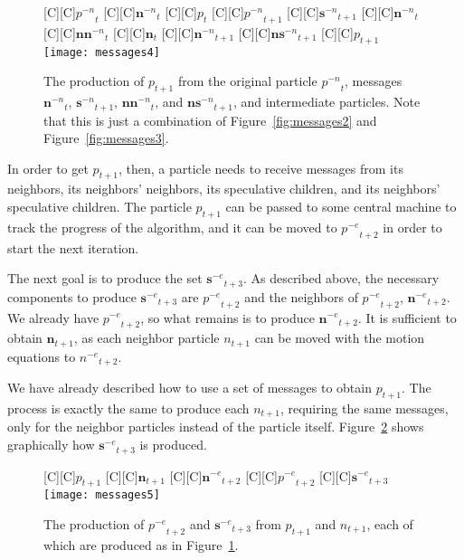 \documentclass[smallcondensed]{svjour3}
\newcommand{\fig}[1]{Figure~\ref{fig:#1}}
\providecommand{\noeval}[1]{\ensuremath{#1^{-e}}}
\providecommand{\nonbest}[1]{\ensuremath{#1^{-n}}}
\providecommand{\p}{\ensuremath{p}}
\providecommand{\sset}{\ensuremath{\mathbf{s}}}
\providecommand{\nsset}{\ensuremath{\mathbf{ns}}}
\providecommand{\n}{\ensuremath{n}}
\providecommand{\nset}{\ensuremath{\mathbf{n}}}
\providecommand{\nnset}{\ensuremath{\mathbf{nn}}}
\begin{document}
\begin{figure}
  \centering
  [C][C]{$\nonbest{\p}_{t}$}
  [C][C]{$\nonbest{\nset}_{t}$}
  [C][C]{$\p_{t}$}
  [C][C]{$\nonbest{\p}_{t+1}$}
  [C][C]{$\nonbest{\sset}_{t+1}$}
  [C][C]{$\nonbest{\nset}_{t}$}
  [C][C]{$\nonbest{\nnset}_{t}$}
  [C][C]{$\nset_{t}$}
  [C][C]{$\nonbest{\nset}_{t+1}$}
  [C][C]{$\nonbest{\nsset}_{t+1}$}
  [C][C]{$\p_{t+1}$}
  \texttt{[image: messages4]}
  \caption{The production of $\p_{t+1}$ from the original particle 
  $\nonbest{\p}_{t}$, messages $\nonbest{\nset}_{t}$, $\nonbest{\sset}_{t+1}$,
  $\nonbest{\nnset}_{t}$, and $\nonbest{\nsset}_{t+1}$, and intermediate
  particles.  Note that this is just a combination of \fig{messages2} and
  \fig{messages3}.}
  \label{fig:messages4}
\end{figure}

In order to get $\p_{t+1}$, then, a particle needs to receive messages from its
neighbors, its neighbors' neighbors, its speculative children, and its
neighbors' speculative children.  The particle $\p_{t+1}$ can be passed to some
central machine to track the progress of the algorithm, and it can be moved to
$\noeval{\p}_{t+2}$ in order to start the next iteration.

The next goal is to produce the set $\noeval{\sset}_{t+3}$.  As described
above, the necessary components to produce $\noeval{\sset}_{t+3}$ are
$\noeval{\p}_{t+2}$ and the neighbors of $\noeval{\p}_{t+2}$,
$\noeval{\nset}_{t+2}$.  We already have $\noeval{\p}_{t+2}$, so what remains
is to produce $\noeval{\nset}_{t+2}$.  It is sufficient to obtain
$\nset_{t+1}$, as each neighbor particle $\n_{t+1}$ can be moved with the
motion equations to $\noeval{\n}_{t+2}$.

We have already described how to use a set of messages to obtain $\p_{t+1}$.
The process is exactly the same to produce each $\n_{t+1}$, requiring the same
messages, only for the neighbor particles instead of the particle itself.
\fig{messages5} shows graphically how $\noeval{\sset}_{t+3}$ is produced.

\begin{figure}
  \centering
  [C][C]{$\p_{t+1}$}
  [C][C]{$\nset_{t+1}$}
  [C][C]{$\noeval{\nset}_{t+2}$}
  [C][C]{$\noeval{\p}_{t+2}$}
  [C][C]{$\noeval{\sset}_{t+3}$}
  \texttt{[image: messages5]}
  \caption{The production of $\noeval{\p}_{t+2}$ and $\noeval{\sset}_{t+3}$
  from $\p_{t+1}$ and $\n_{t+1}$, each of which are produced as in
  \fig{messages4}.}
  \label{fig:messages5}
\end{figure}
\end{document}
